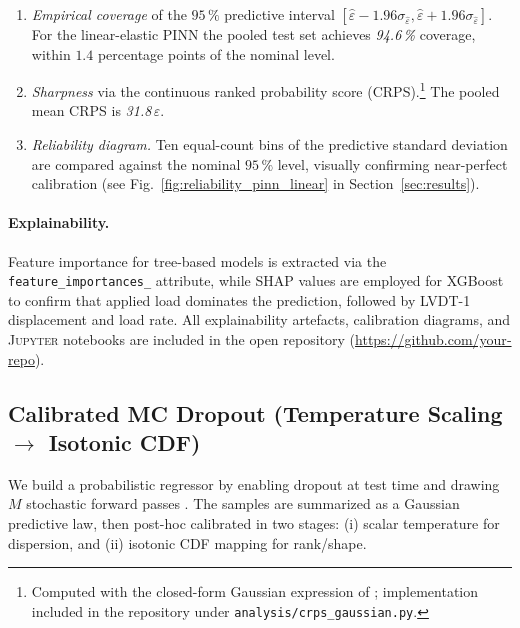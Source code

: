 \documentclass{article}
\begin{document}
\begin{enumerate}[label=(\alph*),leftmargin=14pt]
    \item \emph{Empirical coverage} of the $95\,\%$ predictive interval
          $[\hat\varepsilon-1.96\sigma_{\hat\varepsilon},
            \hat\varepsilon+1.96\sigma_{\hat\varepsilon}]$.
          For the linear-elastic PINN the pooled test set achieves
          \emph{94.6\,\%} coverage, within $1.4$ percentage points
          of the nominal level.
    \item \emph{Sharpness} via the continuous ranked probability score
          (CRPS).\footnote{Computed with the closed-form Gaussian expression
          of \citep{Gneiting2007CRPS}; implementation included in the
          repository under \texttt{analysis/crps\_gaussian.py}.}
          The pooled mean CRPS is \emph{31.8\,\textmu$\varepsilon$}.
    \item \emph{Reliability diagram.}
          Ten equal-count bins of the predictive standard deviation are
          compared against the nominal $95\,\%$ level, visually confirming
          near-perfect calibration
          (see Fig.~\ref{fig:reliability_pinn_linear} in Section~\ref{sec:results}).
\end{enumerate}

\paragraph{Explainability.}
Feature importance for tree-based models is extracted via the
\texttt{feature\_importances\_} attribute,
while SHAP values are employed for XGBoost to confirm that applied load
dominates the prediction, followed by LVDT-1 displacement and load rate.
All explainability artefacts, calibration diagrams, and
\textsc{Jupyter} notebooks are included in the open repository
(\url{https://github.com/your‐repo}).

\subsection{Calibrated MC Dropout (Temperature Scaling $\rightarrow$ Isotonic CDF)}
\label{subsec:calibrated-mcdropout}

We build a probabilistic regressor by enabling dropout at test time and drawing $M$ stochastic forward passes \citep{gal2016dropout}. The samples are summarized as a Gaussian predictive law, then post-hoc calibrated in two stages: (i) scalar temperature for dispersion, and (ii) isotonic CDF mapping for rank/shape.
\end{document}

